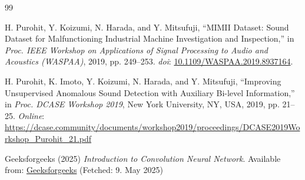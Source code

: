 \documentclass[a4paper,11pt,english]{article}
\begin{document}
{}
\begin{thebibliography}{99}

H. Purohit, Y. Koizumi, N. Harada, and Y. Mitsufuji, 
``MIMII Dataset: Sound Dataset for Malfunctioning Industrial Machine Investigation and Inspection,'' 
in \textit{Proc. IEEE Workshop on Applications of Signal Processing to Audio and Acoustics (WASPAA)}, 2019, pp. 249--253. 
\textit{doi}: \href{https://doi.org/10.1109/WASPAA.2019.8937164}{10.1109/WASPAA.2019.8937164}.

H. Purohit, K. Imoto, Y. Koizumi, N. Harada, and Y. Mitsufuji, 
``Improving Unsupervised Anomalous Sound Detection with Auxiliary Bi-level Information,'' 
in \textit{Proc. DCASE Workshop 2019}, New York University, NY, USA, 2019, pp. 21--25. 
\textit{Online}: \url{https://dcase.community/documents/workshop2019/proceedings/DCASE2019Workshop_Purohit_21.pdf}

    Geeksforgeeks (2025)
    \textit{Introduction to Convolution Neural Network}.
    Available from: \href{https://www.geeksforgeeks.org/introduction-convolution-neural-network/}{Geeksforgeeks}
    (Fetched: 9. May 2025)

\end{thebibliography}
\end{document}
